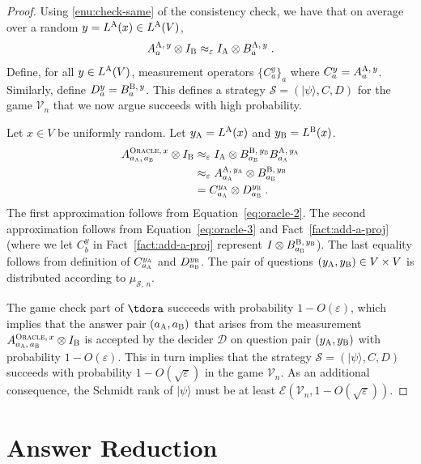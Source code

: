 \documentclass[11pt]{article}
\theoremstyle{definition}
\newcommand{\ket}[1]{|#1\rangle}
\newcommand{\Id}{\ensuremath{I}}
\newcommand{\ot}{\otimes}
\newcommand{\eps}{\varepsilon}
\newcommand{\sampler}{\mathcal{S}}
\newcommand{\decider}{\mathcal{D}}
\newcommand{\verifier}{\mathcal{V}}
\newcommand{\strategy}{\mathscr{S}}
\newcommand{\labelstyle}[1]{\ensuremath{\textsc{#1}}\xspace}
\newcommand{\alice}{\labelstyle{A}}
\newcommand{\bob}{\labelstyle{B}}
\newcommand{\oracle}{\labelstyle{Oracle}}
\newcommand{\Ent}{\mathscr{E}}
\begin{document}
\begin{proof}
  Using \cref{enu:check-same} of the consistency check, we have that on
  average over a random $y = L^\alice(x) \in L^\alice(V)$,
  \begin{equation}
    \label{eq:oracle-3}
    A^{\alice,\, y}_{a} \otimes I_\bob \approx_\eps
    \Id_\alice \otimes B^{\alice,\, y}_{a}\;.
  \end{equation}
  Define, for all $y \in L^\alice(V)$, measurement operators $\{C^y_a\}_a$ where
  $C^y_a = A^{\alice,\, y}_a$.
  Similarly, define $D^y_a = B^{\bob,\, y}_a$.
  This defines a strategy $\strategy = (\ket{\psi},C,D)$ for the game
  $\verifier_n$ that we now argue succeeds with high probability.
    
  Let $x \in V$ be uniformly random.
  Let $y_\alice = L^\alice(x)$ and $y_\bob =L^\bob(x)$.
  \begin{align*}
    A^{\oracle,\, x}_{a_\alice,\, a_\bob} \otimes \Id_\bob
    & \approx_\eps \Id_\alice \otimes
      B^{\bob,\, y_\bob}_{a_\bob} B^{\alice,\, y_\alice}_{a_\alice} \\
    & \approx_{\eps} A^{\alice,\, y_\alice}_{a_\alice} \otimes
      B^{\bob,\, y_\bob}_{a_\bob} \\
    & = C^{y_\alice}_{a_\alice} \otimes D^{y_\bob}_{a_\bob}\;.
  \end{align*}
	The first approximation follows from Equation~\eqref{eq:oracle-2}.
  The second approximation follows from Equation~\eqref{eq:oracle-3} and
  Fact~\ref{fact:add-a-proj} (where we let $C^y_b$ in Fact~\ref{fact:add-a-proj}
  represent $\Id\ot B^{\bob,\, y_\bob}_{a_\bob}$).
  The last equality follows from definition of $C^{y_\alice}_{a_\alice}$ and
  $D^{y_\bob}_{a_\bob}$.
  The pair of questions $(y_\alice, y_\bob) \in V \times V$ is distributed
  according to $\mu_{\sampler,\, n}$.

  The game check part of $\tdora$ succeeds with probability $1 -
  O(\eps)$, which implies that the answer pair $(a_\alice, a_\bob)$ that arises
  from the measurement $A^{\oracle,\, x}_{a_\alice,\, a_\bob} \otimes \Id_\bob$
  is accepted by the decider $\decider$ on question pair $(y_\alice,y_\bob)$
  with probability $1 - O(\eps)$.
  This in turn implies that the strategy $\strategy = (\ket{\psi},C,D)$ succeeds
  with probability $1 - O(\sqrt{\eps})$ in the game $\verifier_n$.
  As an additional consequence, the Schmidt rank of $\ket{\psi}$ must be at
  least $\Ent(\verifier_n, 1 - O(\sqrt{\eps}))$.
\end{proof}

 
\section{Answer Reduction}
\label{sec:ans}
\end{document}
